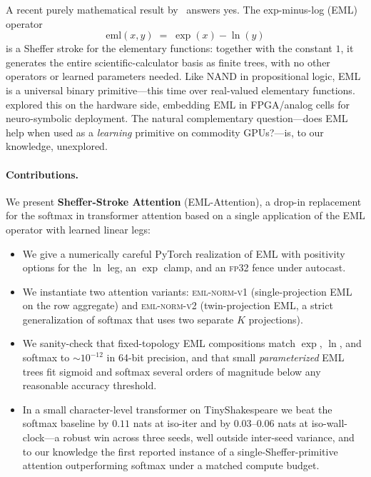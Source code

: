 \documentclass{article}
\begin{document}
A recent purely mathematical result by~\citet{odrzywolek2026eml} answers
yes. The exp-minus-log (EML) operator
\begin{equation}
  \mathrm{eml}(x, y) \;=\; \exp(x) - \ln(y)
  \label{eq:eml}
\end{equation}
is a Sheffer stroke for the elementary functions: together with the
constant $1$, it generates the entire scientific-calculator basis as
finite trees, with no other operators or learned parameters needed. Like
NAND in propositional logic, EML is a universal binary primitive---this
time over real-valued elementary functions. \citet{odrzywolek2026hardware}
explored this on the hardware side, embedding EML in FPGA/analog cells for
neuro-symbolic deployment. The natural complementary question---does EML
help when used as a \emph{learning} primitive on commodity GPUs?---is, to
our knowledge, unexplored.

\paragraph{Contributions.} We present \textbf{Sheffer-Stroke Attention}
(EML-Attention), a drop-in replacement for the softmax in transformer
attention based on a single application of the EML operator with learned
linear legs:
\begin{itemize}
  \item We give a numerically careful PyTorch realization of EML with
        positivity options for the $\ln$ leg, an $\exp$ clamp, and an
        \textsc{fp32} fence under autocast.
  \item We instantiate two attention variants: \textsc{eml-norm-v1}
        (single-projection EML on the row aggregate) and
        \textsc{eml-norm-v2} (twin-projection EML, a strict generalization
        of softmax that uses two separate $K$ projections).
  \item We sanity-check that fixed-topology EML compositions match
        $\exp$, $\ln$, and softmax to $\sim$$10^{-12}$ in 64-bit precision,
        and that small \emph{parameterized} EML trees fit sigmoid and
        softmax several orders of magnitude below any reasonable accuracy
        threshold.
  \item In a small character-level transformer on TinyShakespeare we beat
        the softmax baseline by $0.11$ nats at iso-iter and by $0.03$--$0.06$
        nats at iso-wall-clock---a robust win across three seeds, well
        outside inter-seed variance, and to our knowledge the first
        reported instance of a single-Sheffer-primitive attention
        outperforming softmax under a matched compute budget.
\end{itemize}
\end{document}
